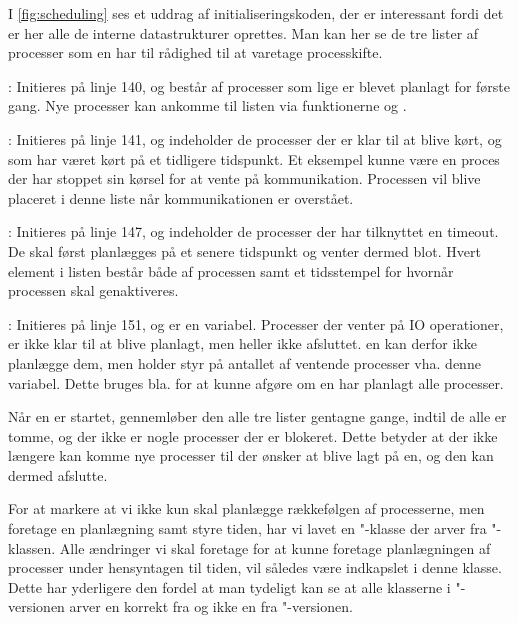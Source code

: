  I \cref{fig:scheduling} ses et uddrag af initialiseringskoden, der er interessant fordi det er her alle de interne datastrukturer oprettes. Man kan her se de  tre lister af processer som \sched en har til rådighed til at varetage processkifte. 
 \begin{list}
 \tightlist 
 \item {}: Initieres på linje 140, og består af processer som lige er blevet planlagt for første gang. Nye processer kan ankomme til listen  via funktionerne  og .
 \item {}: Initieres på linje 141, og indeholder de processer der er klar til at blive kørt, og som har været kørt på et tidligere tidspunkt. Et eksempel kunne være en proces der har stoppet sin kørsel for at vente på kommunikation. Processen vil blive placeret i denne liste når kommunikationen er overstået. 
 \item {}: Initieres på linje 147, og indeholder de processer der har tilknyttet en timeout. De skal først planlægges på et senere tidspunkt og venter dermed blot. Hvert element i listen består både af processen samt et tidsstempel for hvornår processen skal genaktiveres. 
 \item {}: Initieres på linje 151, og er en variabel. Processer der venter på IO operationer, er ikke klar til at blive planlagt, men heller ikke afsluttet. \Sched en kan derfor ikke planlægge dem, men holder styr på antallet af ventende processer vha. denne variabel. Dette bruges bla. for at kunne afgøre om \sched en har planlagt alle processer.
\end{list}

Når \sched en er startet, gennemløber den alle tre lister gentagne gange, indtil de alle er tomme, og der ikke er nogle processer der er blokeret. Dette betyder at der ikke længere kan komme nye processer til der ønsker at blive lagt på \sched en, og den kan dermed afslutte.

For at markere at vi ikke kun skal  planlægge rækkefølgen
af processerne, men foretage en planlægning samt styre tiden, har vi lavet en
"-klasse der arver fra "-klassen. Alle ændringer
vi skal foretage for at kunne foretage planlægningen af processer under hensyntagen til tiden, vil således være indkapslet i denne klasse. 
Dette har yderligere den fordel at man tydeligt kan se at alle klasserne i "-versionen arver en korrekt \sched fra  og
ikke en \sched \xspace fra "-versionen.

